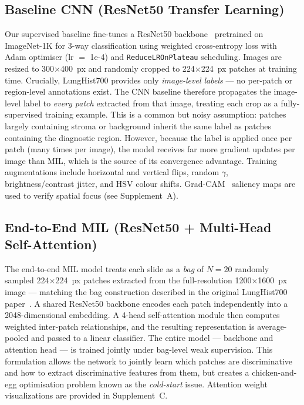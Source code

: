 \documentclass[10pt,twocolumn,letterpaper]{article}
\begin{document}
\subsection{Baseline CNN (ResNet50 Transfer Learning)}
Our supervised baseline fine-tunes a ResNet50 backbone~\cite{resnet} pretrained on ImageNet-1K for 3-way classification using weighted cross-entropy loss with Adam optimiser (lr $=$ 1e-4) and \texttt{ReduceLROnPlateau} scheduling. Images are resized to 300$\times$400~px and randomly cropped to 224$\times$224~px patches at training time. Crucially, LungHist700 provides only \emph{image-level labels} — no per-patch or region-level annotations exist. The CNN baseline therefore propagates the image-level label to \emph{every patch} extracted from that image, treating each crop as a fully-supervised training example. This is a common but noisy assumption: patches largely containing stroma or background inherit the same label as patches containing the diagnostic region. However, because the label is applied once per patch (many times per image), the model receives far more gradient updates per image than MIL, which is the source of its convergence advantage. Training augmentations include horizontal and vertical flips, random $\gamma$, brightness/contrast jitter, and HSV colour shifts. Grad-CAM~\cite{gradcam} saliency maps are used to verify spatial focus (see Supplement~A).

\subsection{End-to-End MIL (ResNet50 + Multi-Head Self-Attention)}
The end-to-end MIL model treats each slide as a \emph{bag} of $N=20$ randomly sampled 224$\times$224~px patches extracted from the full-resolution 1200$\times$1600~px image — matching the bag construction described in the original LungHist700 paper~\cite{lunghist700paper}. A shared ResNet50 backbone encodes each patch independently into a 2048-dimensional embedding. A 4-head self-attention module then computes weighted inter-patch relationships, and the resulting representation is average-pooled and passed to a linear classifier. The entire model — backbone and attention head — is trained jointly under bag-level weak supervision. This formulation allows the network to jointly learn which patches are discriminative and how to extract discriminative features from them, but creates a chicken-and-egg optimisation problem known as the \emph{cold-start} issue. Attention weight visualizations are provided in Supplement~C.
\end{document}
